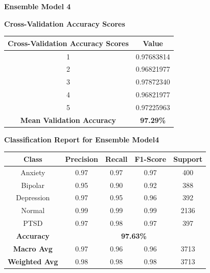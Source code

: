 \pagebreak

\vspace{1em}
\noindent
\textbf{Ensemble Model 4}

\begin{center}
    \textbf{Cross-Validation Accuracy Scores} \\[0.5em]
    \begin{tabular}{|c|c|}
        \hline
        \textbf{Cross-Validation Accuracy Scores} & \textbf{Value} \\ \hline
        1 & 0.97683814 \\ \hline
        2 & 0.96821977 \\ \hline
        3 & 0.97872340 \\ \hline
        4 & 0.96821977 \\ \hline
        5 & 0.97225963 \\ \hline
        \textbf{Mean Validation Accuracy} & \textbf{97.29\%} \\ \hline
    \end{tabular}
\end{center}

\begin{center}
    \textbf{Classification Report for Ensemble Model4} \\[0.5em]
    \begin{tabular}{|c|c|c|c|c|}
        \hline
        \textbf{Class} & \textbf{Precision} & \textbf{Recall} & \textbf{F1-Score} & \textbf{Support} \\ \hline
        Anxiety & 0.97 & 0.97 & 0.97 & 400 \\ \hline
        Bipolar & 0.95 & 0.90 & 0.92 & 388 \\ \hline
        Depression & 0.97 & 0.95 & 0.96 & 392 \\ \hline
        Normal & 0.99 & 0.99 & 0.99 & 2136 \\ \hline
        PTSD & 0.97 & 0.98 & 0.97 & 397 \\ \hline
        \textbf{Accuracy} & \multicolumn{4}{c|}{\textbf{97.63\%}} \\ \hline
        \textbf{Macro Avg} & 0.97 & 0.96 & 0.96 & 3713 \\ \hline
        \textbf{Weighted Avg} & 0.98 & 0.98 & 0.98 & 3713 \\ \hline
    \end{tabular}
\end{center}


